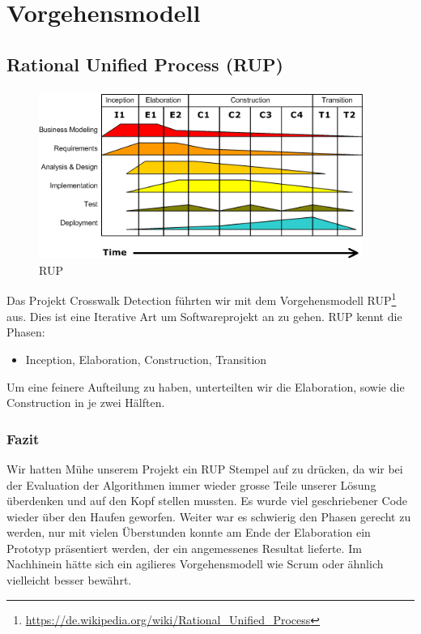 \section{Vorgehensmodell}
\subsection{Rational Unified Process (RUP)}

\begin{figure}[H]
\centering
\includegraphics[width=300pt]{images/rup.png}
\caption[RUP]{RUP}
\end{figure}

Das Projekt Crosswalk Detection führten wir mit dem Vorgehensmodell RUP\footnote{\url{https://de.wikipedia.org/wiki/Rational_Unified_Process}} aus.
Dies ist eine Iterative Art um Softwareprojekt an zu gehen. RUP kennt die Phasen:

\begin{itemize}
	\item Inception, Elaboration, Construction, Transition
\end{itemize}

Um eine feinere Aufteilung zu haben, unterteilten wir die Elaboration, sowie die Construction in je zwei Hälften. 

\subsubsection{Fazit}
Wir hatten Mühe unserem Projekt ein RUP Stempel auf zu drücken, da wir bei der Evaluation der Algorithmen immer wieder grosse Teile unserer Lösung überdenken und auf den Kopf stellen mussten. Es wurde viel geschriebener Code wieder über den Haufen geworfen. Weiter war es schwierig den Phasen gerecht zu werden, nur mit vielen Überstunden konnte am Ende der Elaboration ein Prototyp präsentiert werden, der ein angemessenes Resultat lieferte. Im Nachhinein hätte sich ein agilieres Vorgehensmodell wie Scrum oder ähnlich vielleicht besser bewährt.
 

